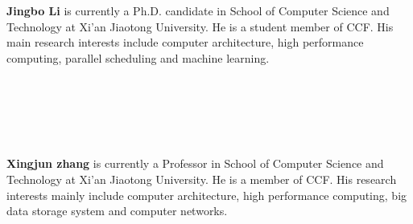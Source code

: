 \documentclass[a4paper,fleqn]{cas-sc}
\begin{document}
\printcredits



\textbf{Jingbo Li} is currently a Ph.D. candidate in School of Computer Science and Technology at Xi'an Jiaotong University. He is a student member of CCF. His main research interests include computer architecture, high performance computing, parallel scheduling and machine learning.
\\
\\
\\
\\
\\
\\
\endbio


\textbf{Xingjun zhang} is currently a Professor in School of Computer Science and Technology at Xi'an Jiaotong University. He is a member of CCF. His research interests mainly include computer architecture, high performance computing, big data storage system and computer networks.
\endbio
\end{document}
